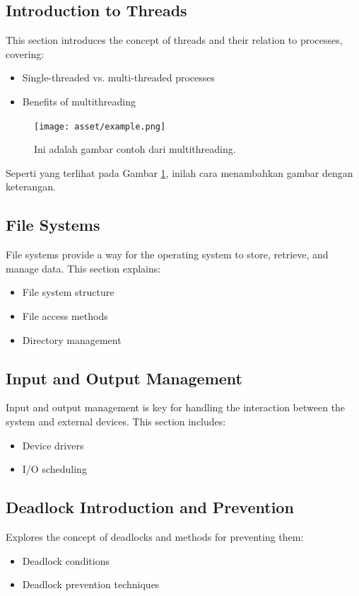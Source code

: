 \documentclass[12pt]{article}
\begin{document}
\subsection{Introduction to Threads}
This section introduces the concept of threads and their relation to processes, covering:
\begin{itemize}
    \item Single-threaded vs. multi-threaded processes
    \item Benefits of multithreading
\end{itemize}

\begin{figure}[h]
    \centering
    \texttt{[image: asset/example.png]}  %
    \caption{Ini adalah gambar contoh dari multithreading.}
    \label{fig:contoh_gambar}
\end{figure}

Seperti yang terlihat pada Gambar \ref{fig:contoh_gambar}, inilah cara menambahkan gambar dengan keterangan.

\subsection{File Systems}
File systems provide a way for the operating system to store, retrieve, and manage data. This section explains:
\begin{itemize}
    \item File system structure
    \item File access methods
    \item Directory management
\end{itemize}

\subsection{Input and Output Management}
Input and output management is key for handling the interaction between the system and external devices. This section includes:
\begin{itemize}
    \item Device drivers
    \item I/O scheduling
\end{itemize}

\subsection{Deadlock Introduction and Prevention}
Explores the concept of deadlocks and methods for preventing them:
\begin{itemize}
    \item Deadlock conditions
    \item Deadlock prevention techniques
\end{itemize}
\end{document}
